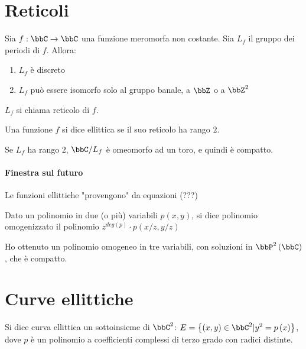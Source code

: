 \section{Reticoli}
Sia $f: \bbC \rar \bbC$ una funzione meromorfa non costante.
Sia $L_f$ il gruppo dei periodi di $f$. Allora:
\begin{enumerate}
 \item $L_f$ è discreto
 \item $L_f$ può essere isomorfo solo al gruppo banale, a $\bbZ$ o a $\bbZ^2$ 
\end{enumerate}

\begin{definizione}[Reticolo]
$L_f$ si chiama reticolo di $f$.
\end{definizione}

\begin{definizione}
Una funzione $f$ si dice ellittica se il suo reticolo ha rango $2$.
\end{definizione}


\begin{osservazione}
Se $L_f$ ha rango 2, $\bbC / L_f$ è omeomorfo ad un toro, e quindi è compatto.
\end{osservazione}

\paragraph{Finestra sul futuro}
Le funzioni ellittiche "provengono" da equazioni (???)


\begin{definizione}
Dato un polinomio in due (o più) variabili $p\left(x,y\right)$, si dice polinomio omogenizzato il
polinomio $z^{deg\left(p\right)}\cdot p\left(x/z,y/z\right)$
\end{definizione}

\begin{osservazione}
Ho ottenuto un polinomio omogeneo in tre variabili, con soluzioni in $\bbP^2 \left( \bbC \right)$, che è compatto.
\end{osservazione}

\section{Curve ellittiche}
\begin{definizione}
Si dice curva ellittica un sottoinsieme di $\bbC^2$: $E= \left\{\left(x,y \right) \in \bbC^2 | y^2=p \left( x \right) \right\}$, dove $p$ è un polinomio a coefficienti complessi di terzo grado con radici distinte.
\end{definizione}

